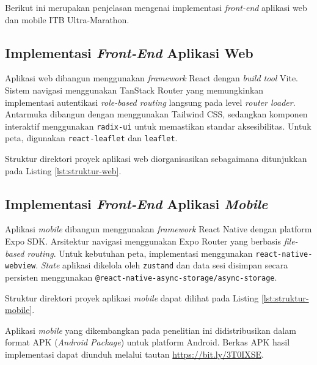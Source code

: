 Berikut ini merupakan penjelasan mengenai implementasi \textit{front-end} aplikasi web dan mobile ITB Ultra-Marathon.

\subsection{Implementasi \textit{Front-End} Aplikasi Web}
\label{sec:impl-web}

Aplikasi web dibangun menggunakan \textit{framework} React dengan \textit{build tool} Vite. Sistem navigasi menggunakan TanStack Router yang memungkinkan implementasi autentikasi \textit{role-based routing} langsung pada level \textit{router loader}. Antarmuka dibangun dengan menggunakan Tailwind CSS, sedangkan komponen interaktif menggunakan \texttt{radix-ui} untuk memastikan standar aksesibilitas. Untuk peta, digunakan \texttt{react-leaflet} dan \texttt{leaflet}.

Struktur direktori proyek aplikasi web diorganisasikan sebagaimana ditunjukkan pada Listing \ref{lst:struktur-web}.



\subsection{Implementasi \textit{Front-End} Aplikasi \textit{Mobile}}
\label{sec:impl-mobile}

Aplikasi \textit{mobile} dibangun menggunakan \textit{framework} React Native dengan platform Expo SDK. Arsitektur navigasi menggunakan Expo Router yang berbasis \textit{file-based routing}. Untuk kebutuhan peta, implementasi menggunakan \texttt{react-native-webview}. \textit{State} aplikasi dikelola oleh \texttt{zustand} dan data sesi disimpan secara persisten menggunakan \texttt{@react-native-async-storage/async-storage}.

Struktur direktori proyek aplikasi \textit{mobile} dapat dilihat pada Listing \ref{lst:struktur-mobile}.



Aplikasi \textit{mobile} yang dikembangkan pada penelitian ini didistribusikan dalam format APK (\textit{Android Package}) untuk platform Android. Berkas APK hasil implementasi dapat diunduh melalui tautan \url{https://bit.ly/3T0IXSE}.


